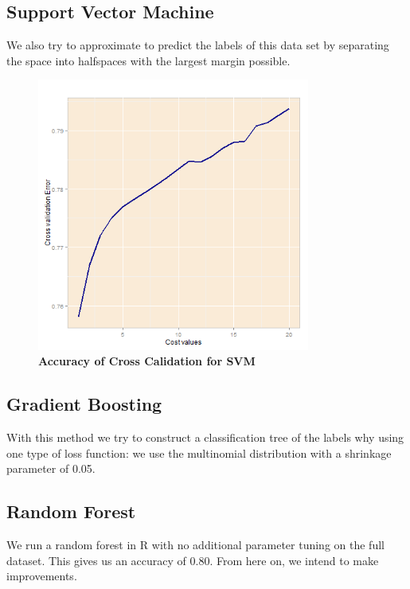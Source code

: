 \documentclass[paper=a4, fontsize=11pt]{scrartcl}
\numberwithin{equation}{section}
\numberwithin{figure}{section}
\numberwithin{table}{section}
\begin{document}


\subsection{Support Vector Machine}
We also try to approximate to predict the labels of this data set by separating the space into halfspaces with the largest margin possible. 

\begin{figure}
    \centering
    \includegraphics[width=0.8\textwidth]{SVMcost.png}
    \caption{\textbf{Accuracy of Cross Calidation for SVM}}
    \label{fig:SVM}
\end{figure}


\subsection{Gradient Boosting}
With this method we try to construct a classification tree of the labels why using one type of loss function: we use the multinomial distribution with a shrinkage parameter of 0.05.  



\subsection{Random Forest}
 We run a random forest in R with no additional parameter tuning on the full dataset. This gives us an accuracy of 0.80. From here on, we intend to make improvements.
\end{document}
